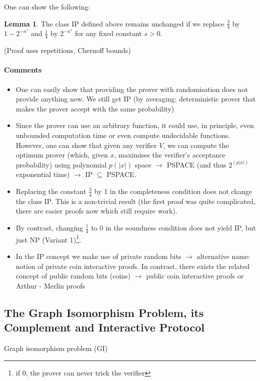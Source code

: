 \documentclass[11pt]{article}
\theoremstyle{definition}
\newtheorem{lemma}[theorem]{Lemma}
\theoremstyle{definition}
\begin{document}
One can show the following:

\begin{lemma}
The class IP defined above remains unchanged if we replace $ \frac{3}{4} $ by $ 1 - 2^{-n^s} $ and $ \frac{1}{4} $ by $ 2^{-n^s} $ for any fixed constant $ s > 0 $.
\end{lemma}
(Proof uses repetitions, Chernoff bounds)

\paragraph{Comments}
\begin{itemize}
\item One can easily show that providing the prover with randomisation does not provide anything new. We still get IP (by averaging: deterministic prover that makes the prover accept with the same probability)
\item Since the prover can use an arbitrary function, it could use, in principle, even unbounded computation time or even compute undecidable functions. However, one can show that given any verifier $ V $, we can compute the optimum prover (which, given $ x $, maximises the verifier's acceptance probability) using polynomial $ p(|x|) $ space $ \rightarrow $ PSPACE (and thus $ 2^{(p|x|)} $ exponential time) $ \rightarrow $ IP $ \subseteq $ PSPACE.
\item Replacing the constant $ \frac{3}{4} $ by 1 in the completeness condition does not change the class IP. This is a non-trivial result (the first proof was quite complicated, there are easier proofs now which still require work).
\item By contrast, changing $ \frac{1}{4} $ to 0 in the soundness condition does not yield IP, but just NP (Variant 1)\footnote{if 0, the prover can never trick the verifier}.
\item In the IP concept we make use of private random bits $ \rightarrow $ alternative name: notion of private coin interactive proofs. In contrast, there exists the related concept of public random bits (coins) $ \rightarrow $ public coin interactive proofs or Arthur - Merlin proofs
\end{itemize}

\subsection{The Graph Isomorphism Problem, its Complement and Interactive Protocol}

Graph isomorphism problem (GI)
\end{document}

